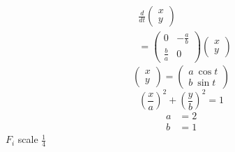 \begin{columns}
\begin{column}{0.35\textwidth}
\vspace{-0.35in}
\begin{align*}
& \frac{d}{dt}
\left(
\begin{array}{c}
x \\ y
\end{array}
\right) \\
& =
\left(
\begin{array}{cc}
0 & - \frac{a}{b} \\
\frac{b}{a}  & 0
\end{array}
\right)
\left(
\begin{array}{c}
x \\ y
\end{array}
\right)
\end{align*}
\begin{equation*}
\left(
\begin{array}{c}
x \\ y
\end{array}
\right)
=
\left(
\begin{array}{c}
a \ \cos t \\
b \ \sin t
\end{array}
\right)
\end{equation*}
\begin{equation*}
\left( \frac{x}{a} \right)^2
+ \left( \frac{y}{b} \right)^2
= 1
\end{equation*}
\begin{align*}
a &= 2 \\
b &= 1
\end{align*}
\hspace{0.4in} $F_i$ scale $\frac{1}{4}$
\end{column}
\end{columns}
